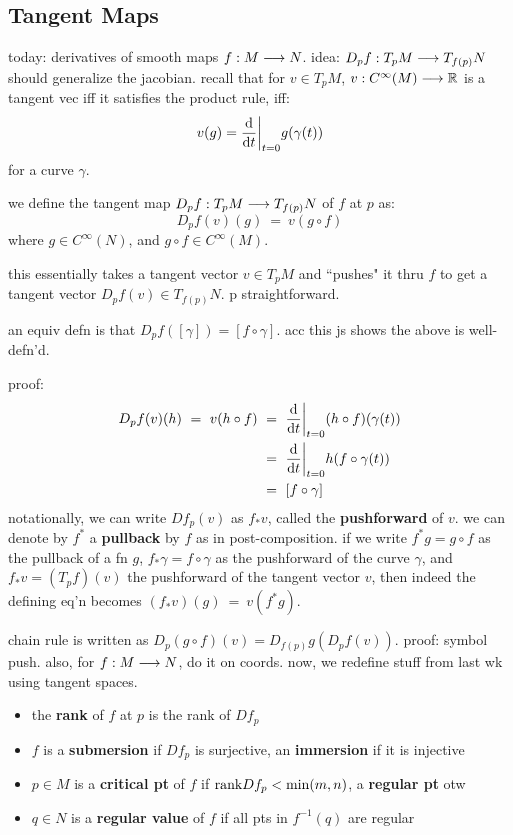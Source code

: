 \subsection{Tangent Maps}

today: derivatives of smooth maps $f:M\longrightarrow N$.
idea: $D_{p}f:T_{p}M\longrightarrow T_{f(p)}N$ should generalize the jacobian.
recall that for $v\in T_{p}M$, $v:C^{\infty}(M)\longrightarrow\mathbb{R}$ is a tangent vec iff
it satisfies the product rule, iff:
\begin{equation*}
	v(g)=\frac{\textrm{d}}{\textrm{d} t}\bigg\rvert_{t=0}g(\gamma(t))
\end{equation*}
for a curve $\gamma$.
\begin{defn}
	we define the tangent map $D_{p}f:T_{p}M\longrightarrow T_{f(p)}N$ of $f$ at $p$ as:
	\begin{equation*}
		D_{p}f(v)(g) \ = \ v(g\circ f)
	\end{equation*}
	where $g\in C^{\infty}(N)$, and $g\circ f\in C^{\infty}(M)$.
\end{defn}
this essentially takes a tangent vector $v\in T_{p}M$ and ``pushes" it thru
$f$ to get a tangent vector $D_{p}f(v)\in T_{f(p)}N$. p straightforward.

\begin{prop}
	an equiv defn is that $D_{p}f([\gamma])=[f\circ\gamma]$.
	acc this js shows the above is well-defn'd.
\end{prop}
proof: \vspace{-0.3in}
\begin{align*}
	D_{p}f(v)(h) \ = \ v(h\circ f)
	& \ = \ \frac{\textrm{d}}{\textrm{d} t}\bigg\rvert_{t=0}(h\circ f)(\gamma(t)) \\
	& \ = \ \frac{\textrm{d}}{\textrm{d} t}\bigg\rvert_{t=0}h(f\circ\gamma(t)) \\
	& \ = \ [f\circ\gamma]
\end{align*}
notationally, we can write $Df_{p}(v)$ as $f_{*}v$, called the \textbf{pushforward} of $v$.
we can denote by $f^{*}$ a \textbf{pullback} by $f$ as in post-composition.
if we write $f^{*}g=g\circ f$ as the pullback of a fn $g$, $f_{*}\gamma=f\circ\gamma$
as the pushforward of the curve $\gamma$, and $f_{*}v=(T_{p}f)(v)$ the pushforward
of the tangent vector $v$, then indeed the defining eq'n becomes
$(f_{*}v)(g) \ = \ v(f^{*}g)$.

chain rule is written as $D_{p}(g\circ f)(v)=D_{f(p)}g(D_{p}f(v))$.
proof: symbol push. also, for $f:M\longrightarrow N$, do it on coords.
now, we redefine stuff from last wk using tangent spaces.
\begin{itemize}
	\item the \textbf{rank} of $f$ at $p$ is the rank of $Df_{p}$
	\item $f$ is a \textbf{submersion} if $Df_{p}$ is surjective,
		an \textbf{immersion} if it is injective
	\item $p\in M$ is a \textbf{critical pt} of $f$ if $\textrm{rank}Df_{p}<\min(m,n)$,
		a \textbf{regular pt} otw
	\item $q\in N$ is a \textbf{regular value} of $f$ if all pts in $f^{-1}(q)$ are regular
\end{itemize}

